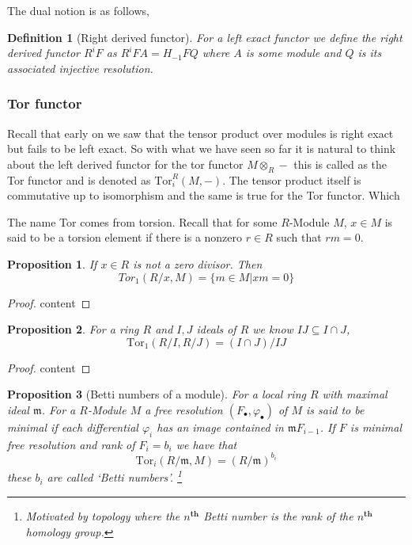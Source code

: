 \documentclass[12pt]{article}
\numberwithin{equation}{section}
\newtheorem{definition}{Definition}[section]
\newtheorem{proposition}{Proposition}[section]
\begin{document}
	The dual notion is as follows,
	\begin{definition}[Right derived functor]
		For a left exact functor we define the right derived functor $R^iF$ as $R^iFA=H_{-1}FQ$ where $A$ is some module and $Q$ is its associated injective resolution.
	\end{definition}
	
	
	\subsubsection{Tor functor}
	Recall that early on we saw that the tensor product over modules is right exact but fails to be left exact. So with what we have seen so far it is natural to think about the left derived functor for the tor functor $M\otimes_R -$ this is called as the Tor functor and is denoted as $\mathrm{Tor}_i^R(M,-)$. The tensor product itself is commutative up to isomorphism and the same is true for the Tor functor. Which 
	
	The name Tor comes from torsion. Recall that for some $R$-Module $M$, $x \in M$ is said to be a torsion element if there is a nonzero $r\in R $ such that $rm=0$.
	\begin{proposition}
		If $x \in R$ is not a zero divisor. Then $$Tor_1(R/x,M)=\{m \in M | xm =0\}$$
	\end{proposition}
	\begin{proof}
		content
	\end{proof}
	\begin{proposition}
		For a ring $R$ and $I,J$ ideals of $R$ we know $IJ \subseteq I \cap J$, \[ \mathrm{Tor}_1(R/I, R/J)= (I \cap J )/IJ\]
	\end{proposition}
	\begin{proof}
		content
	\end{proof}
	
	\begin{proposition}[Betti numbers of a module]
		For a local ring $R$ with maximal ideal $\mathfrak{m}$. For a $R$-Module $M$ a free resolution $(F_\bullet, \varphi_\bullet)$ of $M$ is said to be minimal if each differential $\varphi_i$ has an image contained in $\mathfrak{m}F_{i-1}$. If $F$ is minimal free resolution and rank of $F_i=b_i$ we have that \[ \mathrm{Tor}_i(R/\mathfrak{m}, M)= 	(R/\mathfrak{m})^{b_i}\] these $b_i$ are called `Betti numbers'. \footnote{Motivated by topology where the $n^{\textbf{th}}$ Betti number is the rank of the $n^{\textbf{th}}$ homology group.}
	\end{proposition}
	
\end{document}
